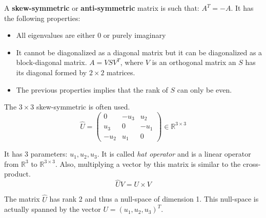 A \textbf{skew-symmetric} or \textbf{anti-symmetric} matrix is such that: $A^T = -A$. It has the following properties:

\begin{itemize}
    \item All eigenvalues are either 0 or purely imaginary
    \item It cannot be diagonalized as a diagonal matrix but it can be diagonalized as a block-diagonal matrix.
    $A = V S V^T$, where $V$ is an orthogonal matrix an $S$ has its diagonal formed by $2\times 2$ matrices.
    \item The previous properties implies that the rank of $S$ can only be even.
\end{itemize}

The $3\times 3$ skew-symmetric is often used.
\begin{equation}
    \hat{U} = \left( \begin{array}{ccc}
        0 & -u_3 & u_2 \\
        u_3 & 0 & -u_1 \\
        -u_2 & u_1 & 0 
    \end{array} \right)
    \in \mathbb{R}^{3\times 3}
\end{equation}

It has 3 parameters: $u_1, u_2, u_3$.
It is called \textit{hat operator} and is a linear operator from $\mathbb{R}^3$ to $\mathbb{R}^{3\times 3}$. Also, multiplying a vector by this matrix is similar to the cross-product.
\begin{equation}
    \hat{U} V = U \times V
\end{equation}

The matrix $\hat{U}$ has rank 2 and thus a null-space of dimension 1. This null-space is actually spanned by the vector $U = (u_1, u_2, u_3)^T$.


